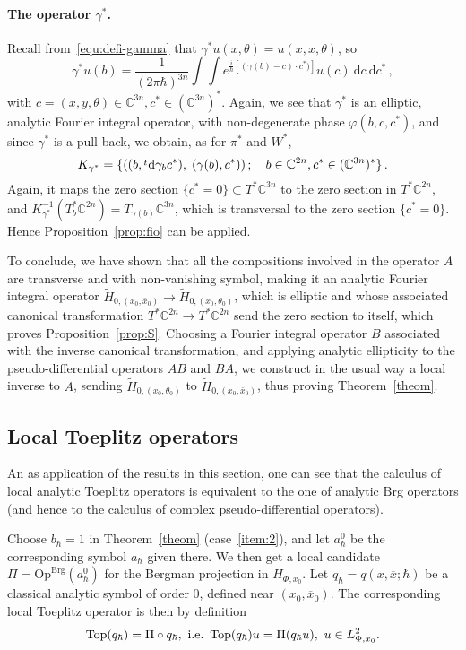 \documentclass{article}
\newcommand{\Brg}{\mathrm{Brg}}
\newcommand{\Top}{\mathop{\textup{Top}}}
\newcommand{\DD}{\:\!\mathrm{d}}
\newcommand{\trsp}{\raisebox{.6ex}{${\scriptstyle t}$}}
\newcommand{\phy}{\varphi}
\newcommand{\intint}{\int\!\!\!\!\int}
\newcommand{\CM}{\mathbb{C}}
\newcommand{\h}{\hbar}
\begin{document}
\paragraph{The operator $\gamma^*$.} Recall
from~\eqref{equ:defi-gamma} that
$\gamma^*u(x,\theta) = u(x,x,\theta)$, so
\[
\gamma^*u(b) = \frac{1}{(2\pi\h)^{3n}} \intint e^{\frac{i}{\h}
  [(\gamma(b)-c)\cdot c^*)]} u(c) \DD c \DD c^*\,,
\]
with $c=(x,y,\theta)\in\CM^{3n}, c^*\in(\CM^{3n})^*$. Again, we see
that $\gamma^*$ is an elliptic, analytic Fourier integral operator,
with non-degenerate phase $\phy(b,c,c^*)$, and since $\gamma^*$
is a pull-back, we obtain, as for $\pi^*$ and $W^*$,
\[
K_{\gamma^*} = \{\left( (b, \trsp\DD\gamma_b c^*),\; (\gamma(b), c^*)
\right) ; \quad b\in \CM^{2n}, c^*\in (\CM^{3n})^*\}\,.
\]
Again, it maps the zero section $\{c^*=0\}\subset T^*\CM^{3n}$ to the
zero section in $T^*\CM^{2n}$, and
$K_{\gamma^*}^{-1}(T^*_b\CM^{2n})= T_{\gamma(b)}\CM^{3n}$, which is
transversal to the zero section $\{c^*=0\}$. Hence
Proposition~\ref{prop:fio} can be applied.

To conclude, we have shown that all the compositions involved in the
operator $A$ are transverse and with non-vanishing symbol, making it
an analytic Fourier integral operator
$\widetilde H_{0,(x_0,\bar x_0)} \to \widetilde H_{0,(x_0,\theta_0)}$,
which is elliptic and whose associated canonical transformation
$T^*\CM^{2n}\to T^*\CM^{2n}$ send the zero section to itself, which
proves Proposition~\ref{prop:S}. Choosing a Fourier integral operator
$B$ associated with the inverse canonical transformation, and applying
analytic ellipticity to the pseudo-differential operators $AB$ and
$BA$, we construct in the usual way a local inverse to $A$, sending
$\widetilde H_{0,(x_0,\theta_0)}$ to
$\widetilde H_{0,(x_0,\bar x_0)}$, thus proving Theorem~\ref{theom}.


\subsection{Local Toeplitz operators}

An as application of the results in this section, one can see that the
calculus of local analytic Toeplitz operators is equivalent to the one
of analytic $\Brg$ operators (and hence to the calculus of complex
pseudo-differential operators).

Choose $b_\hbar=1$ in Theorem~\ref{theom} (case~\ref{item:2}), and let
$a^0_\hbar$ be the corresponding symbol $a_\hbar$ given there. We then
get a local candidate $\Pi =\mathrm{Op}^{\mathrm{Brg}}(a_\hbar^0)$ for
the Bergman projection in $H_{\Phi ,x_0}$. Let
$q_\h=q(x,\overline{x};\hbar )$ be a classical analytic symbol of
order $0$, defined near $(x_0,\overline{x}_0)$. The corresponding
local Toeplitz operator is then by definition
\begin{equation}\label{lto.1}
  \Top(q_\h)=\Pi \circ q_\h,\hbox{ i.e.\ }\Top(q_\h)u=\Pi
  (q_\h u),\ u\in L^2_{\Phi ,x_0}.
\end{equation}
\end{document}
